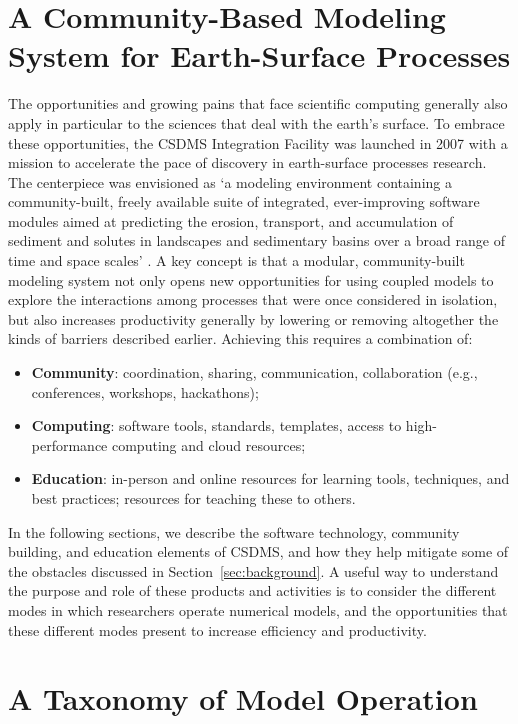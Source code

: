\documentclass[12pt]{amsart}
\begin{document}
\section{A Community-Based Modeling System for Earth-Surface Processes}
\label{sec:csdms}

The opportunities and growing pains that face scientific computing generally also apply in particular to the sciences that deal with the earth's surface. To embrace these opportunities, the CSDMS Integration Facility was launched in 2007 with a mission to accelerate the pace of discovery in earth-surface processes research. The centerpiece was envisioned as `a modeling environment containing a community-built, freely available suite of integrated, ever-improving software modules aimed at predicting the erosion, transport, and accumulation of sediment and solutes in landscapes and sedimentary basins over a broad range of time and space scales' \citep{anderson2004community}. A key concept is that a modular, community-built modeling system not only opens new opportunities for using coupled models to explore the interactions among processes that were once considered in isolation, %
but also increases productivity generally by lowering or removing altogether the kinds of barriers described earlier. Achieving this requires a combination of:
\begin{itemize}
\item
\textbf{Community}: coordination, sharing, communication, collaboration (e.g., conferences, workshops, hackathons);
\item
\textbf{Computing}: software tools, standards, templates, access to high-performance computing and cloud resources;
\item
\textbf{Education}: in-person and online resources for learning tools, techniques, and best practices; resources for teaching these to others.
\end{itemize}
In the following sections, we describe the software technology, community building, and education elements of CSDMS, and how they help mitigate some of the obstacles discussed in Section~\ref{sec:background}. A useful way to understand the purpose and role of these products and activities is to consider the different modes in which researchers operate numerical models, and the opportunities that these different modes present to increase efficiency and productivity.


\section{A Taxonomy of Model Operation}
\label{sec:taxonomy}
\end{document}
